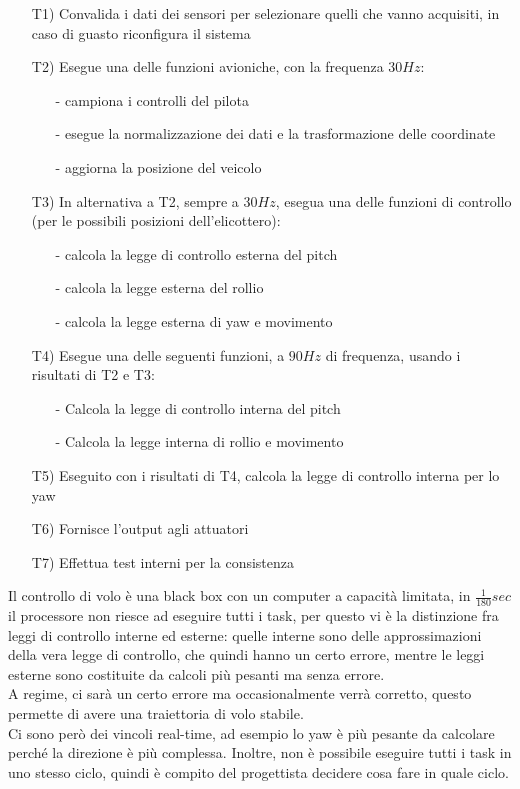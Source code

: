 \documentclass{article}
\begin{document}
\begin{itemize}
\item[T1)] Convalida i dati dei sensori per selezionare quelli che vanno acquisiti, in caso di guasto riconfigura il sistema
\item[T2)] Esegue una delle funzioni avioniche, con la frequenza $30Hz$:
\begin{itemize}
\item[-] campiona i controlli del pilota
\item[-] esegue la normalizzazione dei dati e la trasformazione delle coordinate
\item[-] aggiorna la posizione del veicolo  
\end{itemize}
\item[T3)] In alternativa a T2, sempre a $30Hz$, esegua una delle funzioni di controllo (per le possibili posizioni dell'elicottero):
\begin{itemize}
\item[-] calcola la legge di controllo esterna del pitch
\item[-] calcola la legge esterna del rollio
\item[-] calcola la legge esterna di yaw e movimento
\end{itemize}
\item[T4)] Esegue una delle seguenti funzioni, a $90Hz$ di frequenza, usando i risultati di T2 e T3: 
\begin{itemize}
\item[-] Calcola la legge di controllo interna del pitch
\item[-] Calcola la legge interna di rollio  e movimento
\end{itemize}
\item[T5)] Eseguito con i risultati di T4, calcola la legge di controllo interna per lo yaw
\item[T6)] Fornisce l'output agli attuatori
\item[T7)] Effettua test interni per la consistenza
\end{itemize}
Il controllo di volo è una black box con un computer a capacità limitata, in $\frac{1}{180}sec$ il processore non riesce ad eseguire tutti i task, per questo vi è la distinzione fra leggi di controllo interne ed esterne: quelle interne sono delle approssimazioni della vera legge di controllo, che quindi hanno un certo errore, mentre le leggi esterne sono costituite da calcoli più pesanti ma senza errore.\\ A regime, ci sarà un certo errore ma occasionalmente verrà corretto, questo permette di avere una traiettoria di volo stabile.\\ Ci sono però dei vincoli real-time, ad esempio lo yaw è più pesante da calcolare perché la direzione è più complessa. Inoltre, non è possibile eseguire tutti i task in uno stesso ciclo, quindi è compito del progettista decidere cosa fare in quale ciclo.
\end{document}
